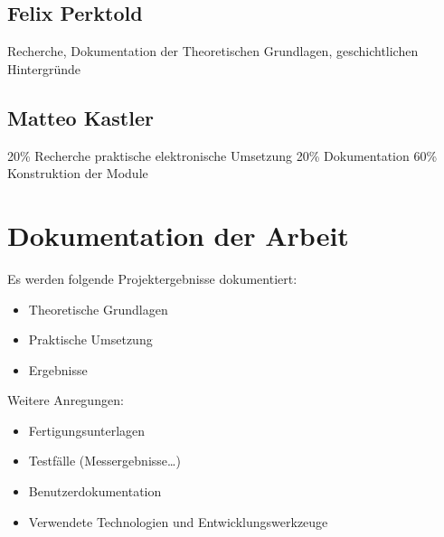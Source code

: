 \subsection{Felix Perktold}
Recherche, Dokumentation der Theoretischen Grundlagen, geschichtlichen Hintergründe

\subsection{Matteo Kastler}
20\% Recherche praktische elektronische Umsetzung
20\% Dokumentation 
60\% Konstruktion der Module

\section{Dokumentation der Arbeit}

Es werden folgende Projektergebnisse dokumentiert:

\begin{itemize}
	\item Theoretische Grundlagen
	\item Praktische Umsetzung
	\item Ergebnisse
\end{itemize}

Weitere Anregungen:

\begin{itemize}
	\item Fertigungsunterlagen
	\item Testfälle (Messergebnisse…)
	\item Benutzerdokumentation
	\item Verwendete Technologien und Entwicklungswerkzeuge
\end{itemize}
